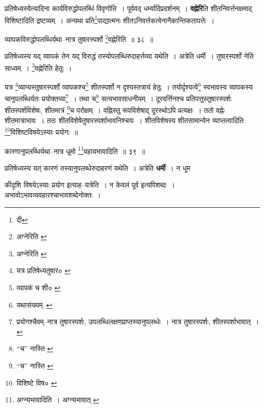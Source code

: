 \documentclass[article,12pt,a4paper]{memoir}
\begin{document}
	  \pstart प्रतिषेध्यस्येत्यादिना कार्यविरुद्धोपलब्धिं विवृणोति । पूर्ववद् धर्म्यादिप्रदर्शनम् । \textbf{वह्नेरि}ति शीतनिवर्त्तनक्षमाद् विशिष्टादिति द्रष्टव्यम् । अन्यथा प्रति\footnote{दी}\-पाद्यात्मनः शीतऽनिवर्त्तकत्वेनानैकान्तिकतापत्तेः ।
	\pend
	  \bigskip
	  \begingroup
	
	  \bigskip
	  \begingroup
	

	  \pstart व्यापकविरुद्धोपलब्धिर्यथा--नात्र तुषारस्पर्शो \footnote{अग्नेरिति \cite{dp-msB} \cite{dp-msC} \cite{dp-edP} \cite{dp-edH} \cite{dp-edN} \cite{dp-edE}}\-वह्नेरिति ॥ ३८ ॥
	\pend
      
	  \endgroup
	 

	  \pstart प्रतिषेध्यस्य यद् व्यापकं तेन यद् विरुद्धं तस्योपलब्धिरुदाहर्त्तव्या यथेति । अत्रेति धर्मी । तुषारस्पर्शो नेति साध्यम् । \footnote{अग्नेरिति \cite{dp-msD} \cite{dp-msB}}\-वह्नेरिति हेतुः ।
	\pend
       

	  \pstart यत्र \footnote{यत्र प्रतिषेध्यतुषार० \cite{dp-msC}}\-व्याप्यस्तुषारस्पर्शो व्यापकश्च\footnote{व्यापकं च शी० \cite{dp-msD}} शीतस्पर्शो न दृश्यस्तत्रायं हेतुः । तयोर्दृश्यत्वे\footnote{यथासंख्यम्--\cite{dp-msD-n}} स्वभावस्य व्यापकस्य चानुपलब्धिर्यतः प्रयोक्तव्या\footnote{प्रयोगश्चैवम्--नात्र तुषारस्पर्शः, उपलब्धिलक्षणप्राप्तस्यानुपलब्धेः । नात्र तुषारस्पर्शः, शीतस्पर्शाभावात् ।} । तथा च\footnote{“च” नास्ति \cite{dp-msB} \cite{dp-edP} \cite{dp-edE}} सत्यभावसाधनीयम् । दूरवर्त्तिनश्च प्रतिपत्तुस्तुषारस्पर्शः शीतस्पर्शविशेषः, शीतमात्रं \footnote{“च” नास्ति \cite{dp-msB}}\-च परोक्षम् । वह्निस्तु रूपविशेषाद् दूरस्थोऽपि प्रत्यक्षः । ततो वह्नेः शीतमात्राभावः । ततः शीतविशेषेतुषारस्पर्शाभावनिश्चयः । शीतविशेषस्य शीतसामान्येन व्याप्तत्वादिति \footnote{विशिष्टे विष० \cite{dp-msB}}\-विशिष्टविषयेऽस्याः प्रयोगः ॥
	\pend
       
	  \bigskip
	  \begingroup
	

	  \pstart कारणानुपलब्धिर्यथा--नात्र धूमो \footnote{अग्न्यभावादिति । \cite{dp-msB} \cite{dp-msD} \cite{dp-edP} \cite{dp-edH} \cite{dp-edN} अग्न्यभावात् \cite{dp-edE}}\-वहायभावादिति ॥ ३९ ॥
	\pend
      
	  \endgroup
	 

	  \pstart प्रतिषेध्यस्य यत् कारणं तस्यानुपलब्धेरुदाहरणं यथेति । अत्रेति \textbf{धर्मी} । न धूम
	\pend
      
	  \endgroup
	

	  \pstart कीदृशि विषयेऽस्याः प्रयोग इत्याह--यत्रेति । न केवलं पूर्व इत्यपिशब्दः । अभावोऽभावव्यवहारश्चाभावशब्देनोक्तः ।
	\pend
      
\end{document}

